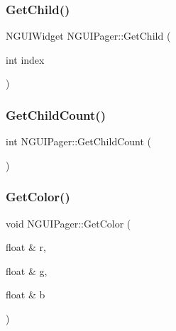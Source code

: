 \hypertarget{class_n_g_u_i_pager_a159a10e41748b5100b3f221fe89a859a}{}\label{class_n_g_u_i_pager_a159a10e41748b5100b3f221fe89a859a} 
\subsubsection{\texorpdfstring{Get\+Child()}{GetChild()}\hspace{0.1cm}{\footnotesize\ttfamily [2/2]}}
{\footnotesize\ttfamily N\+G\+U\+I\+Widget N\+G\+U\+I\+Pager\+::\+Get\+Child (\begin{DoxyParamCaption}\item[{int}]{index }\end{DoxyParamCaption})}

\hypertarget{class_n_g_u_i_pager_a0cd9357fbe6d7d0a378da540f89933ac}{}\label{class_n_g_u_i_pager_a0cd9357fbe6d7d0a378da540f89933ac} 
\subsubsection{\texorpdfstring{Get\+Child\+Count()}{GetChildCount()}}
{\footnotesize\ttfamily int N\+G\+U\+I\+Pager\+::\+Get\+Child\+Count (\begin{DoxyParamCaption}{ }\end{DoxyParamCaption})}

\hypertarget{class_n_g_u_i_pager_a46974513026e47b98472244040a14d68}{}\label{class_n_g_u_i_pager_a46974513026e47b98472244040a14d68} 
\subsubsection{\texorpdfstring{Get\+Color()}{GetColor()}}
{\footnotesize\ttfamily void N\+G\+U\+I\+Pager\+::\+Get\+Color (\begin{DoxyParamCaption}\item[{float \&}]{r,  }\item[{float \&}]{g,  }\item[{float \&}]{b }\end{DoxyParamCaption})}

\hypertarget{class_n_g_u_i_pager_aef691c43a887fc973407e1c009bf4baa}{}\label{class_n_g_u_i_pager_aef691c43a887fc973407e1c009bf4baa} 
